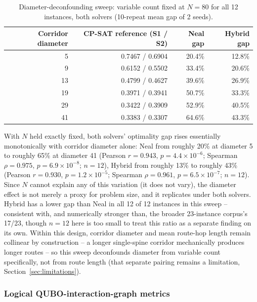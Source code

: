 \documentclass[11pt]{article}
\begin{document}
\begin{table}[h]
\centering
\caption{Diameter-deconfounding sweep: variable count fixed at $N=80$ for all 12 instances, both solvers (10-repeat mean gap of 2 seeds).}
\label{tab:dsweep}
\small
\begin{tabular}{rrrr}
\toprule
Corridor diameter & CP-SAT reference (S1 / S2) & Neal gap & Hybrid gap \\
\midrule
5  & 0.7467 / 0.6904 & 20.4\% & 12.8\% \\
9  & 0.6152 / 0.5502 & 33.4\% & 20.6\% \\
13 & 0.4799 / 0.4627 & 39.6\% & 26.9\% \\
19 & 0.3971 / 0.3941 & 50.7\% & 33.3\% \\
29 & 0.3422 / 0.3909 & 52.9\% & 40.5\% \\
41 & 0.3383 / 0.3307 & 64.6\% & 43.3\% \\
\bottomrule
\end{tabular}
\end{table}

With $N$ held exactly fixed, both solvers' optimality gap rises essentially monotonically with corridor diameter alone: Neal from roughly 20\% at diameter 5 to roughly 65\% at diameter 41 (Pearson $r=0.943$, $p=4.4\times10^{-6}$; Spearman $\rho=0.975$, $p=6.9\times10^{-8}$; $n=12$), Hybrid from roughly 13\% to roughly 43\% (Pearson $r=0.930$, $p=1.2\times10^{-5}$; Spearman $\rho=0.961$, $p=6.5\times10^{-7}$; $n=12$). Since $N$ cannot explain any of this variation (it does not vary), the diameter effect is not merely a proxy for problem size, and it replicates under both solvers. Hybrid has a lower gap than Neal in all 12 of 12 instances in this sweep -- consistent with, and numerically stronger than, the broader 23-instance corpus's 17/23, though $n=12$ here is too small to treat this ratio as a separate finding on its own. Within this design, corridor diameter and mean route-hop length remain collinear by construction -- a longer single-spine corridor mechanically produces longer routes -- so this sweep deconfounds diameter from variable count specifically, not from route length (that separate pairing remains a limitation, Section~\ref{sec:limitations}).

\subsubsection{Logical QUBO-interaction-graph metrics}
\label{sec:qubograph}
\end{document}
